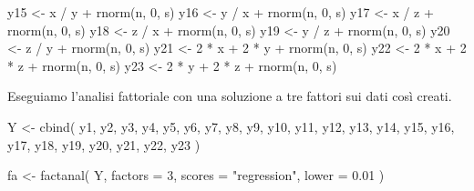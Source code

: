 \documentclass[
  11pt,
]{krantz}
\makeatletter
\newenvironment{Shaded}{\begin{snugshade}}{\end{snugshade}}
\newcommand{\AttributeTok}[1]{\textcolor[rgb]{0.61,0.61,0.61}{#1}}
\newcommand{\DecValTok}[1]{\textcolor[rgb]{0.06,0.06,0.06}{#1}}
\newcommand{\FloatTok}[1]{\textcolor[rgb]{0.06,0.06,0.06}{#1}}
\newcommand{\FunctionTok}[1]{\textcolor[rgb]{0,0,0}{#1}}
\newcommand{\NormalTok}[1]{#1}
\newcommand{\OtherTok}[1]{\textcolor[rgb]{0.37,0.37,0.37}{#1}}
\newcommand{\SpecialCharTok}[1]{\textcolor[rgb]{0,0,0}{#1}}
\newcommand{\StringTok}[1]{\textcolor[rgb]{0.5,0.5,0.5}{#1}}
\newenvironment{kframe}{%
\medskip{}
\setlength{\fboxsep}{.8em}
 \def\at@end@of@kframe{}%
 \ifinner\ifhmode%
  \def\at@end@of@kframe{\end{minipage}}%
  \begin{minipage}{\columnwidth}%
 \fi\fi%
 \def\FrameCommand##1{\hskip\@totalleftmargin \hskip-\fboxsep
 \colorbox{shadecolor}{##1}\hskip-\fboxsep
     \hskip-\linewidth \hskip-\@totalleftmargin \hskip\columnwidth}%
 \MakeFramed {\advance\hsize-\width
   \@totalleftmargin\z@ \linewidth\hsize
   \@setminipage}}%
 {\par\unskip\endMakeFramed%
 \at@end@of@kframe}
\renewenvironment{Shaded}{\begin{kframe}}{\end{kframe}}
\theoremstyle{definition}
\theoremstyle{definition}
\theoremstyle{definition}
\theoremstyle{definition}
\theoremstyle{remark}
\makeatother
\begin{document}
\begin{Shaded}
\begin{Highlighting}[]
\NormalTok{y15 }\OtherTok{\textless{}{-}}\NormalTok{ x }\SpecialCharTok{/}\NormalTok{ y }\SpecialCharTok{+} \FunctionTok{rnorm}\NormalTok{(n, }\DecValTok{0}\NormalTok{, s)}
\NormalTok{y16 }\OtherTok{\textless{}{-}}\NormalTok{ y }\SpecialCharTok{/}\NormalTok{ x }\SpecialCharTok{+} \FunctionTok{rnorm}\NormalTok{(n, }\DecValTok{0}\NormalTok{, s)}
\NormalTok{y17 }\OtherTok{\textless{}{-}}\NormalTok{ x }\SpecialCharTok{/}\NormalTok{ z }\SpecialCharTok{+} \FunctionTok{rnorm}\NormalTok{(n, }\DecValTok{0}\NormalTok{, s)}
\NormalTok{y18 }\OtherTok{\textless{}{-}}\NormalTok{ z }\SpecialCharTok{/}\NormalTok{ x }\SpecialCharTok{+} \FunctionTok{rnorm}\NormalTok{(n, }\DecValTok{0}\NormalTok{, s)}
\NormalTok{y19 }\OtherTok{\textless{}{-}}\NormalTok{ y }\SpecialCharTok{/}\NormalTok{ z }\SpecialCharTok{+} \FunctionTok{rnorm}\NormalTok{(n, }\DecValTok{0}\NormalTok{, s)}
\NormalTok{y20 }\OtherTok{\textless{}{-}}\NormalTok{ z }\SpecialCharTok{/}\NormalTok{ y }\SpecialCharTok{+} \FunctionTok{rnorm}\NormalTok{(n, }\DecValTok{0}\NormalTok{, s)}
\NormalTok{y21 }\OtherTok{\textless{}{-}} \DecValTok{2} \SpecialCharTok{*}\NormalTok{ x }\SpecialCharTok{+} \DecValTok{2} \SpecialCharTok{*}\NormalTok{ y }\SpecialCharTok{+} \FunctionTok{rnorm}\NormalTok{(n, }\DecValTok{0}\NormalTok{, s)}
\NormalTok{y22 }\OtherTok{\textless{}{-}} \DecValTok{2} \SpecialCharTok{*}\NormalTok{ x }\SpecialCharTok{+} \DecValTok{2} \SpecialCharTok{*}\NormalTok{ z }\SpecialCharTok{+} \FunctionTok{rnorm}\NormalTok{(n, }\DecValTok{0}\NormalTok{, s)}
\NormalTok{y23 }\OtherTok{\textless{}{-}} \DecValTok{2} \SpecialCharTok{*}\NormalTok{ y }\SpecialCharTok{+} \DecValTok{2} \SpecialCharTok{*}\NormalTok{ z }\SpecialCharTok{+} \FunctionTok{rnorm}\NormalTok{(n, }\DecValTok{0}\NormalTok{, s)}
\end{Highlighting}
\end{Shaded}

Eseguiamo l'analisi fattoriale con una soluzione a tre fattori sui dati così creati.

\begin{Shaded}
\begin{Highlighting}[]
\NormalTok{Y }\OtherTok{\textless{}{-}} \FunctionTok{cbind}\NormalTok{(}
\NormalTok{  y1, y2, y3, y4, y5, y6, y7, y8, y9,}
\NormalTok{  y10, y11, y12, y13, y14, y15, y16,}
\NormalTok{  y17, y18, y19, y20, y21, y22, y23}
\NormalTok{)}

\NormalTok{fa }\OtherTok{\textless{}{-}} \FunctionTok{factanal}\NormalTok{(}
\NormalTok{  Y,}
  \AttributeTok{factors =} \DecValTok{3}\NormalTok{,}
  \AttributeTok{scores =} \StringTok{"regression"}\NormalTok{,}
  \AttributeTok{lower =} \FloatTok{0.01}
\NormalTok{)}
\end{Highlighting}
\end{Shaded}
\end{document}
